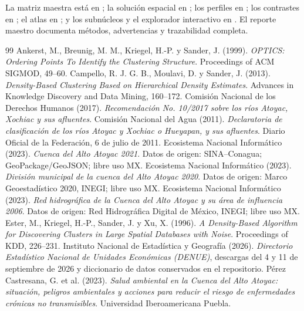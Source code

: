 \documentclass[11pt,letterpaper]{article}
\begin{document}
La matriz maestra está en ; la solución espacial en ; los perfiles en ; los contrastes en ; el atlas en ; y los subnúcleos y el explorador interactivo en . El reporte maestro documenta métodos, advertencias y trazabilidad completa.

\begin{thebibliography}{99}\small
{} Ankerst, M., Breunig, M. M., Kriegel, H.-P. y Sander, J. (1999). \emph{OPTICS: Ordering Points To Identify the Clustering Structure}. Proceedings of ACM SIGMOD, 49--60.
 Campello, R. J. G. B., Moulavi, D. y Sander, J. (2013). \emph{Density-Based Clustering Based on Hierarchical Density Estimates}. Advances in Knowledge Discovery and Data Mining, 160--172.
 Comisión Nacional de los Derechos Humanos (2017). \emph{Recomendación No. 10/2017 sobre los ríos Atoyac, Xochiac y sus afluentes}.
 Comisión Nacional del Agua (2011). \emph{Declaratoria de clasificación de los ríos Atoyac y Xochiac o Hueyapan, y sus afluentes}. Diario Oficial de la Federación, 6 de julio de 2011.
 Ecosistema Nacional Informático (2023). \emph{Cuenca del Alto Atoyac 2021}. Datos de origen: SINA--Conagua; GeoPackage/GeoJSON; libre uso MX.
 Ecosistema Nacional Informático (2023). \emph{División municipal de la cuenca del Alto Atoyac 2020}. Datos de origen: Marco Geoestadístico 2020, INEGI; libre uso MX.
 Ecosistema Nacional Informático (2023). \emph{Red hidrográfica de la Cuenca del Alto Atoyac y su área de influencia 2006}. Datos de origen: Red Hidrográfica Digital de México, INEGI; libre uso MX.
 Ester, M., Kriegel, H.-P., Sander, J. y Xu, X. (1996). \emph{A Density-Based Algorithm for Discovering Clusters in Large Spatial Databases with Noise}. Proceedings of KDD, 226--231.
 Instituto Nacional de Estadística y Geografía (2026). \emph{Directorio Estadístico Nacional de Unidades Económicas (DENUE)}, descargas del 4 y 11 de septiembre de 2026 y diccionario de datos conservados en el repositorio.
 Pérez Castresana, G. et al. (2023). \emph{Salud ambiental en la Cuenca del Alto Atoyac: situación, peligros ambientales y acciones para reducir el riesgo de enfermedades crónicas no transmisibles}. Universidad Iberoamericana Puebla.
\end{thebibliography}
\end{document}
